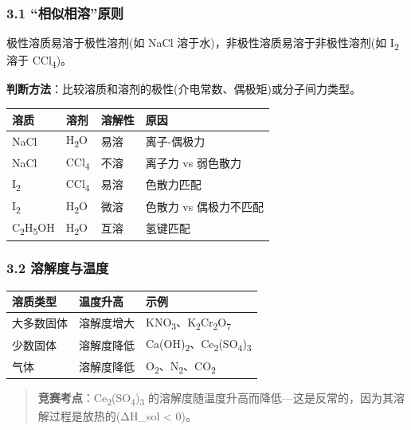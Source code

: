 \subsubsection{3.1 ``相似相溶''原则}\label{ux76f8ux4f3cux76f8ux6eb6ux539fux5219}

极性溶质易溶于极性溶剂(如 NaCl 溶于水)，非极性溶质易溶于非极性溶剂(如 I\textsubscript{2} 溶于 CCl\textsubscript{4})。

\textbf{判断方法}：比较溶质和溶剂的极性(介电常数、偶极矩)或分子间力类型。

{\def\LTcaptype{none} %
\begin{longtable}[]{@{}llll@{}}
\toprule\noalign{}
溶质 & 溶剂 & 溶解性 & 原因 \\
\midrule\noalign{}
\endhead
\bottomrule\noalign{}
\endlastfoot
NaCl & H\textsubscript{2}O & 易溶 & 离子-偶极力 \\
NaCl & CCl\textsubscript{4} & 不溶 & 离子力 vs 弱色散力 \\
I\textsubscript{2} & CCl\textsubscript{4} & 易溶 & 色散力匹配 \\
I\textsubscript{2} & H\textsubscript{2}O & 微溶 & 色散力 vs 偶极力不匹配 \\
C\textsubscript{2}H\textsubscript{5}OH & H\textsubscript{2}O & 互溶 & 氢键匹配 \\
\end{longtable}
}

\subsubsection{3.2 溶解度与温度}\label{ux6eb6ux89e3ux5ea6ux4e0eux6e29ux5ea6}

{\def\LTcaptype{none} %
\begin{longtable}[]{@{}lll@{}}
\toprule\noalign{}
溶质类型 & 温度升高 & 示例 \\
\midrule\noalign{}
\endhead
\bottomrule\noalign{}
\endlastfoot
大多数固体 & 溶解度增大 & KNO\textsubscript{3}、K\textsubscript{2}Cr\textsubscript{2}O\textsubscript{7} \\
少数固体 & 溶解度降低 & Ca(OH)\textsubscript{2}、Ce\textsubscript{2}(SO\textsubscript{4})\textsubscript{3} \\
气体 & 溶解度降低 & O\textsubscript{2}、N\textsubscript{2}、CO\textsubscript{2} \\
\end{longtable}
}

\begin{quote}
\textbf{竞赛考点}：Ce\textsubscript{2}(SO\textsubscript{4})\textsubscript{3} 的溶解度随温度升高而降低---这是反常的，因为其溶解过程是放热的(ΔH\_sol \textless{} 0)。
\end{quote}

